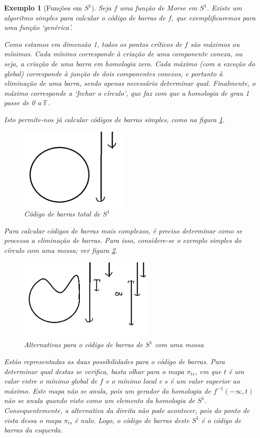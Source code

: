 \documentclass[11pt]{article}
\newtheorem{ex}{Exemplo}
\theoremstyle{nonumberplain}
\newcommand{\FF}{\mathbb{F}}
\begin{document}
\begin{ex}[Funções em $S^1$]
Seja $f$ uma função de Morse em $S^1$. Existe um algoritmo simples para calcular o código de barras de $f$, que exemplificaremos para uma função `genérica'.

Como estamos em dimensão 1, todos os pontos críticos de $f$ são máximos ou mínimos. Cada mínimo corresponde à criação de uma componente conexa, ou seja, a criação de uma barra em homologia zero. Cada máximo (com a exceção do global) corresponde à junção de dois componentes conexos, e portanto à eliminação de uma barra, sendo apenas necessário determinar qual. Finalmente, o máximo corresponde a `fechar o círculo', que faz com que a homologia de grau 1 passe de 0 a $\FF$.

Isto permite-nos já calcular códigos de barras simples, como na figura \ref{bcs11}.
\begin{figure}[H]
\centering
\includegraphics[height=4cm]{bcs11}
\caption{Código de barras total de $S^1$} \label{bcs11}
\end{figure}

Para calcular códigos de barras mais complexos, é preciso determinar como se processa a eliminação de barras. Para isso, considere-se o exemplo simples do círculo com uma mossa; ver figura \ref{bcs12}.
\begin{figure}[H]
\centering
\includegraphics[height=4cm]{bcs12}
\caption{Alternativas para o código de barras de $S^1$ com uma mossa} \label{bcs12}
\end{figure}

Estão representadas as duas possibilidades para o código de barras. Para determinar qual destas se verifica, basta olhar para o mapa $\pi_{ts}$, em que $t$ é um valor entre o mínimo global de $f$ e o mínimo local e $s$ é um valor superior ao máximo. Este mapa não se anula, pois um gerador da homologia de $f^{-1}(-\infty,t)$ não se anula quando visto como um elemento da homologia de $S^1$. Consequentemente, a alternativa da direita não pode acontecer, pois do ponto de vista dessa o mapa $\pi_{ts}$ é nulo. Logo, o código de barras deste $S^1$ é o código de barras da esquerda.


\end{ex}
\end{document}
